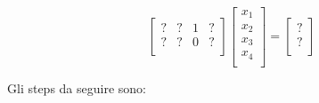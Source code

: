 $$
\left[ {\begin{array}{cccc}
	? & ? & 1 & ? \\
	? & ? & 0 & ? \\
\end{array} } \right]
\left[ {\begin{array}{c}
	x_1 \\
	x_2 \\
	x_3 \\
	x_4 \\
\end{array} } \right]
=
\left[ {\begin{array}{c}
	? \\
	? \\
\end{array} } \right]
$$

Gli steps da seguire sono:

